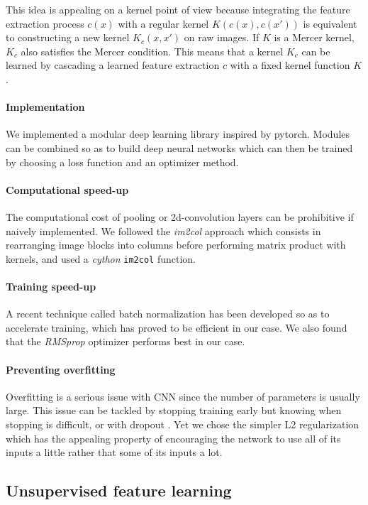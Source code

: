 \documentclass{article} %
\begin{document}
This idea is appealing on a kernel point of view because integrating the feature extraction process $c(x)$ with a regular kernel $K (c(x), c(x′ ))$ is equivalent to constructing a new kernel $K_c(x, x′)$ on raw images. If $K$ is a Mercer kernel, $K_c$ also satisfies the Mercer condition. This means that a kernel $K_c$ can be learned by cascading a learned feature extraction $c$ with a fixed kernel function $K$.

\paragraph{Implementation}

We implemented a modular deep learning library inspired by pytorch. Modules can be combined so as to build deep neural networks which can then be trained by choosing a loss function and an optimizer method.

\paragraph{Computational speed-up}
The computational cost of pooling or 2d-convolution layers can be prohibitive if naively implemented. We followed the \textit{im2col} approach which consists in rearranging image blocks into columns before performing matrix product with kernels, and used a \textit{cython} \texttt{im2col} function.

\paragraph{Training speed-up}
A recent technique called batch normalization \cite{IoffeS15} has been developed so as to accelerate training, which has proved to be efficient in our case. We also found that the \textit{RMSprop} optimizer \cite{Tieleman2012} performs best in our case.

\paragraph{Preventing overfitting}
Overfitting is a serious issue with CNN since the number of parameters is usually large. This issue can be tackled by stopping training early but knowing when stopping is difficult, or with dropout \cite{Srivastava:2014}. Yet we chose the simpler L2 regularization which has the appealing property of encouraging the network to use all of its inputs a little rather that some of its inputs a lot.

\subsection{Unsupervised feature learning}
\end{document}
